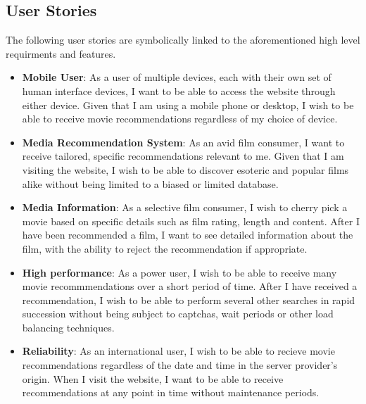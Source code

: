 \documentclass{article}
\begin{document}
\subsection{User Stories}
The following user stories are symbolically linked to the aforementioned high
level requirments and features.
\begin{itemize}
\item
\textbf{Mobile User}: As a user of multiple devices, each with their own set
of human interface devices, I want to be able to access the website through
either device. Given that I am using a mobile phone or desktop, I wish to
be able to receive movie recommendations regardless of my choice of device.

\item
\textbf{Media Recommendation System}: As an avid film consumer, I want to
receive tailored, specific recommendations relevant to me. Given that I am
visiting the website, I wish to be able to discover esoteric and popular
films alike without being limited to a biased or limited database.

\item
\textbf{Media Information}: As a selective film consumer, I wish to cherry pick
a movie based on specific details such as film rating, length and content. After
I have been recommended a film, I want to see detailed information about the
film, with the ability to reject the recommendation if appropriate.

\item
\textbf{High performance}: As a power user, I wish to be able to receive many
movie recommmendations over a short period of time. After I have received
a recommendation, I wish to be able to perform several other searches in rapid
succession without being subject to captchas, wait periods or other load
balancing techniques.

\item
\textbf{Reliability}: As an international user, I wish to be able to recieve 
movie recommendations regardless of the date and time in the server provider's
origin. When I visit the website, I want to be able to receive recommendations 
at any point in time without maintenance periods.
\end{itemize}
\end{document}
